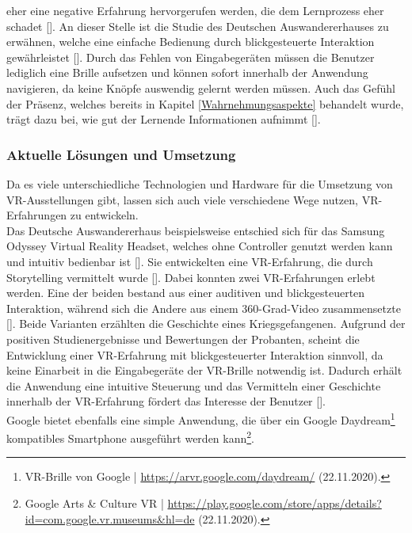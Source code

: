 \documentclass[a4paper,12pt,oneside]{article}
\begin{document}
        eher eine negative Erfahrung hervorgerufen werden, die dem Lernprozess eher
        schadet [\cite[777]{Katz2015}]. An dieser Stelle ist die
        Studie des Deutschen Auswandererhauses zu erwähnen, welche eine einfache
        Bedienung durch blickgesteuerte Interaktion gewährleistet [\cite[38]{Heidsiek2019}].
        Durch das Fehlen von Eingabegeräten müssen die Benutzer lediglich 
        eine Brille aufsetzen und können
        sofort innerhalb der Anwendung navigieren, da keine Knöpfe
        auswendig gelernt werden müssen.
        Auch das Gefühl der Präsenz, welches bereits in Kapitel \ref{Wahrnehmungsaspekte}
        behandelt wurde, trägt dazu bei, wie gut der Lernende Informationen aufnimmt
        [\cite[777]{Katz2015}].
      \subsubsection{Aktuelle Lösungen und Umsetzung} \label{Aktuelle Lösungen und Umsetzung}
        Da es viele unterschiedliche Technologien und Hardware für die Umsetzung von 
        VR-Ausstellungen 
        gibt, lassen sich auch viele verschiedene Wege nutzen, VR-Erfahrungen 
        zu entwickeln. \\
        Das Deutsche Auswandererhaus beispielsweise entschied sich für das Samsung Odyssey
        Virtual Reality Headset, welches ohne Controller genutzt werden kann und intuitiv
        bedienbar ist [\cite[35]{Heidsiek2019}]. Sie entwickelten eine VR-Erfahrung, die
        durch Storytelling vermittelt wurde [\cite[35-39]{Heidsiek2019}]. Dabei
        konnten zwei VR-Erfahrungen erlebt werden. Eine der beiden bestand aus einer 
        auditiven und
        blickgesteuerten Interaktion, während sich die Andere aus 
        einem 360-Grad-Video zusammensetzte [\cite[38]{Heidsiek2019}]. Beide Varianten
        erzählten die Geschichte eines Kriegsgefangenen.
        Aufgrund der positiven Studienergebnisse und Bewertungen der Probanten, scheint
        die Entwicklung einer VR-Erfahrung mit blickgesteuerter Interaktion sinnvoll, da
        keine Einarbeit in die Eingabegeräte der VR-Brille notwendig ist. Dadurch erhält
        die Anwendung eine intuitive Steuerung und das Vermitteln einer Geschichte 
        innerhalb der VR-Erfahrung fördert das Interesse der Benutzer [\cite[35-39]{Heidsiek2019}]. \\
        Google bietet ebenfalls eine simple Anwendung, die über ein Google Daydream\footnote{VR-Brille von Google | \url{https://arvr.google.com/daydream/} (22.11.2020).}
        kompatibles Smartphone ausgeführt werden kann\footnote{Google Arts \& Culture VR | \url{https://play.google.com/store/apps/details?id=com.google.vr.museums&hl=de} (22.11.2020).}.
\end{document}
